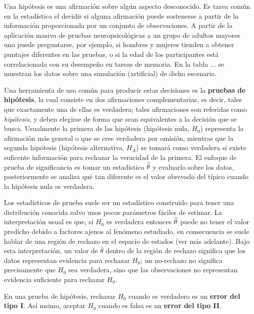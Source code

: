
Una hipótesis es una afirmación sobre algún aspecto desconocido.
%
Es tarea común en la estadística el decidir si alguna afirmación puede sostenerse a partir de la
información proporcionada por un conjunto de observaciones. 
%
A partir de la aplicación masiva de pruebas neuropsicológicas a un grupo de adultos mayores uno 
puede preguntarse, por ejemplo, si hombres y mujeres tienden a obtener puntajes diferentes en las
pruebas, o si la edad de los participantes está correlacionada con su desempeño en tareas de 
memoria.
%
En la tabla ... se muestran los datos sobre una simulación (artificial) de dicho escenario.

Una herramienta de uso común para producir estas decisiones es la \textbf{pruebas de hipótesis},
la cual consiste en dos afirmaciones complementarias, es decir, tales que exactamente una de ellas es verdadera; tales afirmaciones
son referidas como \textit{hipótesis}, y deben elegirse de forma que sean equivalentes a la 
decisión que se busca. 
%
Usualmente la primera de las hipótesis (hipótesis nula, $H_0$) representa la afirmación más general o que se cree verdadera por omisión, mientras que la segunda hipótesis (hipótesis alternativa, $H_A$) se tomará como verdadera si
existe suficente información para rechazar la veracidad de la primera.
%
%
El enfoque de prueba de significancia es  tomar un estadístico $\widehat{ \theta }$ y evaluarlo sobre los datos, posteriormente se analiza qué tan diferente es el valor obrevado del típico cuando la hipótesis nula es verdadera.

Los estadísticos de prueba suele ser un estadístico construido para tener una distribución conocida salvo unos pocos parámetros fáciles de estimar.
%
La interpretación usual es que, si $H_0$ es verdadera entonces $\widehat{ \theta }$ puede no tener el valor predicho debido a factores ajenos al fenómeno estudiado, en consecuencia se suele hablar de una región de rechazo en el espacio de estados (ver más adelante).
%
Bajo esta interpretación, un valor de $\widehat{\theta}$ dentro de la región de rechazo significa que los datos representan evidencia para rechazar $H_0$; un no-rechazo no significa precisamente que $H_0$ sea verdadera, sino que las observaciones no representan evidencia suficiente para rechazar $H_0$.

\begin{definicion}
En una prueba de hipótesis, rechazar $H_0$ cuando es verdadero es un \textbf{error del tipo I}. Así msimo, aceptar $H_0$ cuando es falsa es un \textbf{error del tipo II}.
\end{definicion}

